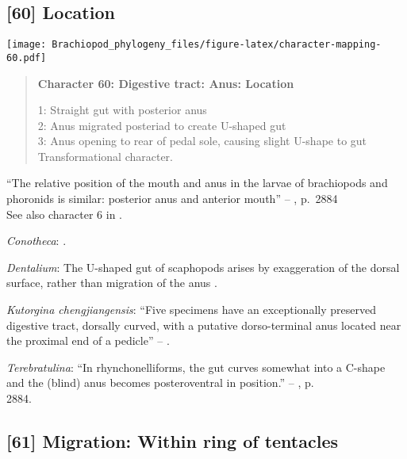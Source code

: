 \documentclass[openany]{book}
\theoremstyle{definition}
\theoremstyle{definition}
\theoremstyle{definition}
\theoremstyle{remark}
\begin{document}
\subsection*{{[}60{]} Location}\label{location}

\texttt{[image: Brachiopod\_phylogeny\_files/figure-latex/character-mapping-60.pdf]}

\begin{quote}
\textbf{Character 60: Digestive tract: Anus: Location}

1: Straight gut with posterior anus\\
2: Anus migrated posteriad to create U-shaped gut\\
3: Anus opening to rear of pedal sole, causing slight U-shape to gut\\
Transformational character.
\end{quote}

``The relative position of the mouth and anus in the larvae of
brachiopods and phoronids is similar: posterior anus and anterior
mouth'' -- \citet{Williams2007Supplement}, p.~2884\\
See also character 6 in \citet{Haszprunar2008}.

\hypertarget{Conotheca-coding-60}{}
\emph{Conotheca}: \citep{Devaere2014}.

\hypertarget{Dentalium-coding-60}{}
\emph{Dentalium}: The U-shaped gut of scaphopods arises by exaggeration
of the dorsal surface, rather than migration of the anus
\citep{Steiner1992}.

\hypertarget{Kutorgina_chengjiangensis-coding-60}{}
\emph{Kutorgina chengjiangensis}: ``Five specimens have an exceptionally
preserved digestive tract, dorsally curved, with a putative
dorso-terminal anus located near the proximal end of a pedicle'' --
\citet{Zhang2007Rhynchonelliformeanbrachiopods}.

\hypertarget{Terebratulina-coding-60}{}
\emph{Terebratulina}: ``In rhynchonelliforms, the gut curves somewhat
into a C-shape and the (blind) anus becomes posteroventral in
position.'' -- \citet{Williams2007Supplement}, p.\\
2884.

\subsection*{{[}61{]} Migration: Within ring of
tentacles}\label{migration-within-ring-of-tentacles}
\end{document}
